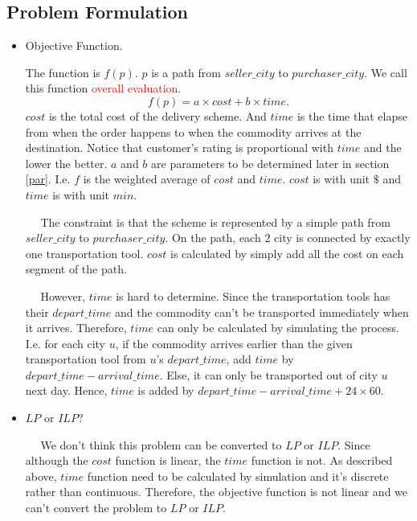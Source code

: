 \documentclass[11pt, a4paper]{article} %
\begin{document}
	\subsection{Problem Formulation}\label{1-PF}
	\begin{itemize}
		\item Objective Function.\par
		The function is $f(p)$. $p$ is a path from $seller\_city$ to $purchaser\_city$. We call this function \textcolor{red}{overall evaluation}.
		$$f(p) = a\times cost+b\times time.$$
		$cost$ is the total cost of the delivery scheme. And  $time$ is the time that elapse from when the order happens to when the commodity arrives at the destination. Notice that customer's rating is proportional with $time$ and the lower the better. $a$ and $b$ are parameters to be determined later in section \ref{par}. I.e. $f$ is the weighted average of $cost$ and $time$. $cost$ is with unit $\$$ and $time$ is with unit $min$.\par
		$\quad$ The constraint is that the scheme is represented by a simple path from $seller\_city$ to $purchaser\_city$. On the path, each 2 city is connected by exactly one transportation tool. $cost$ is calculated by simply add all the cost on each segment of the path.\par
		$\quad$ However, $time$ is hard to determine. Since the transportation tools has their $depart\_time$ and the commodity can't be transported immediately when it arrives. Therefore, $time$ can only be calculated by simulating the process. I.e. for each city $u$, if the commodity arrives earlier than the given transportation tool from $u$'s $depart\_time$, add $time$ by $depart\_time-arrival\_time$. Else, it can only be transported out of city $u$ next day. Hence, $time$ is added by $depart\_time-arrival\_time+24\times 60$.\\
		\item $LP$ or $ILP$?\par
		$\quad$ We don't think this problem can be converted to $LP$ or $ILP$. Since although the $cost$ function is linear, the $time$ function is not. As described above, $time$ function need to be calculated by simulation and it's discrete rather than continuous. Therefore, the objective function is not linear and we can't convert the problem to $LP$ or $ILP$.
	\end{itemize}
	
\end{document}
